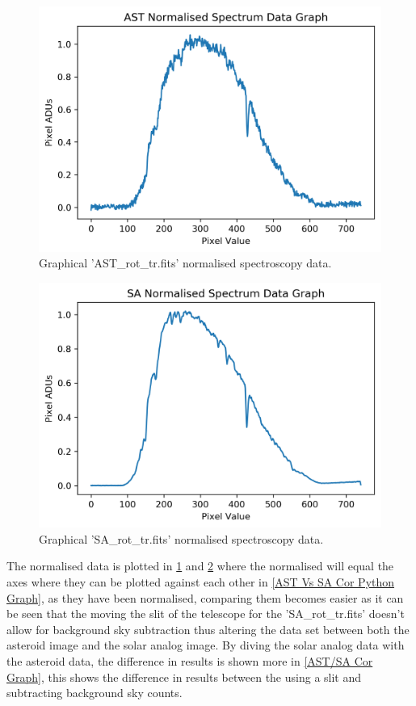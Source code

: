 \documentclass[12pt]{article}
\begin{document}
\begin{multicols}{2}
\begin{figure}[H]
  \centering
  \ContinuedFloat*
  \includegraphics[scale=0.6]{Images/AsImages/S4/SC/ASTCorPythonGraph.png}
  \caption{\label{AST Cor Python Graph} Graphical 'AST\_rot\_tr.fits' normalised spectroscopy data.}
\end{figure}
\begin{figure}[H]
  \centering
  \ContinuedFloat
  \includegraphics[scale=0.6]{Images/AsImages/S4/SC/SACorPythonGraph.png}
  \caption{\label{SA Cor Graph} Graphical 'SA\_rot\_tr.fits' normalised spectroscopy data.}
\end{figure}
\end{multicols}

The normalised data is plotted in \cref{AST Cor Python Graph} and \cref{SA Cor Graph} where the normalised will equal the axes where they can be plotted against each other in \cref{AST Vs SA Cor Python Graph}, as they have been normalised, comparing them becomes easier as it can be seen that the moving the slit of the telescope for the 'SA\_rot\_tr.fits' doesn't allow for background sky subtraction thus altering the data set between both the asteroid image and the solar analog image. By diving the solar analog data with the asteroid data, the difference in results is shown more in \cref{AST/SA Cor Graph}, this shows the difference in results between the using a slit and subtracting background sky counts. \\
\end{document}
